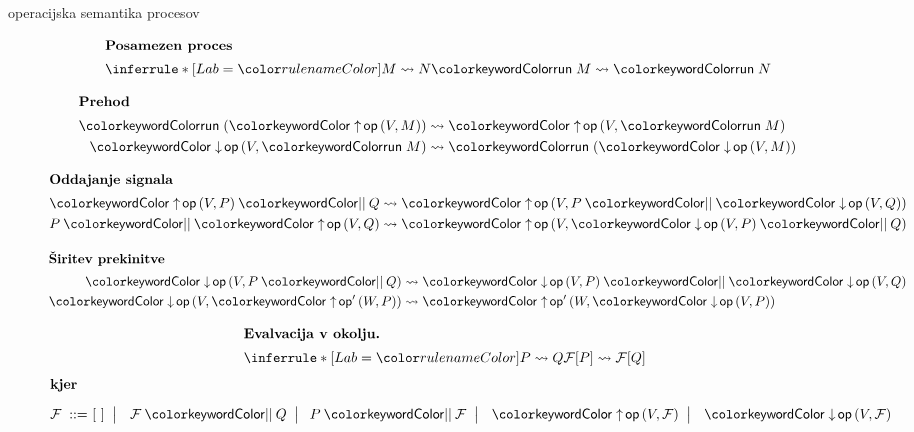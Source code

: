 \documentclass{beamer}
\theoremstyle{definition} %
\theoremstyle{plain} %
\begin{document}
	\begin{frame}{\lae{} operacijska semantika procesov}
		\begin{figure}[tp]
			\parbox{\textwidth}{
				\centering
				\tiny
				\begin{minipage}[t]{0.4\textwidth}
					\centering
					\begin{align*}
					\shortintertext{\textbf{Posamezen proces}}
					\coopinfer{}{
						M \reduces N
					}{
						\tmrun M \reduces \tmrun N
					}
					\end{align*}
				\end{minipage}
				\qquad
				\begin{minipage}[t]{0.4\textwidth}
					\centering
					\begin{align*}
					\shortintertext{\textbf{Prehod}}
					\tmrun {(\tmopout{op}{V}{M})}  &\reduces \tmopout{op}{V}{\tmrun M}
					\\
					\tmopin{op}{V}{\tmrun M} &\reduces \tmrun {(\tmopin{op}{V}{M})}
					\end{align*}
				\end{minipage}
				
				
				\begin{minipage}[t]{0.4\textwidth}
					\centering
					\begin{align*}
					\shortintertext{\textbf{Oddajanje signala}}
					\tmpar{\tmopout{op}{V}{P}}{Q} &\reduces \tmopout{op}{V}{\tmpar{P}{\tmopin{op}{V}{Q}}}
					\\
					\tmpar{P}{\tmopout{op}{V}{Q}} &\reduces \tmopout{op}{V}{\tmpar{\tmopin{op}{V}{P}}{Q}}
					\end{align*}
				\end{minipage}
				\qquad
				\begin{minipage}[t]{0.4\textwidth}
					\centering
					\begin{align*}
					\shortintertext{\textbf{Širitev prekinitve}}
					\tmopin{op}{V}{\tmpar P Q} &\reduces \tmpar {\tmopin{op}{V}{P}} {\tmopin{op}{V}{Q}}
					\\
					\tmopin{op}{V}{\tmopout{op'}{W}{P}} &\reduces \tmopout{op'}{W}{\tmopin{op}{V}{P}}
					\end{align*}
				\end{minipage}
				
		
				\begin{align*}
				\shortintertext{\quad\textbf{Evalvacija v okolju.}}
				\quad
				\coopinfer{}{
					P \reduces Q
				}{
					\F[P] \reduces \F[Q]
				}
				\end{align*}
				\vspace{-8ex}
				\begin{align*}
				\shortintertext{\textbf{kjer}\vspace{1ex}}
				\text{$\F$}
				\bnfis& [~]
				\bnfor \tmpar \F Q \bnfor\! \tmpar P \F
				\bnfor \tmopout{op}{V}{\F}
				\bnfor \tmopin{op}{V}{\F}
				\end{align*}
			} 
		\end{figure}
	\end{frame}
\end{document}

